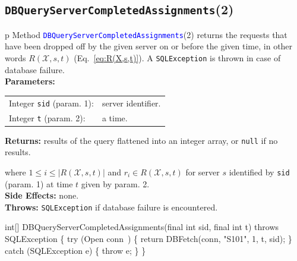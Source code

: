 \subsection{\texttt{DBQueryServerCompletedAssignments}(2)}
\begin{tabular}{p{\textwidth}}
\toprule
{}
Method \textcolor{blue}{{\tt{}\protect{}DBQueryServerCompletedAssignments}}(2) returns the
requests that have been dropped off by the given server on or before the given time,
in other words $R(\mathcal{X},s,t)$ (Eq.~\ref{eq:R(X,s,t)}).
A {\tt{}SQLException} is thrown in case of database failure.\\
\midrule
\textbf{Parameters:} \\
\begin{tabular}{lp{116mm}}
Integer {\tt{}sid} (param. 1):&server identifier.\\
Integer {\tt{}t} (param. 2):&a time.\\
\end{tabular}
\textbf{Returns:} results of the query flattened into an integer array,
or {\tt{}null} if no results.


where $1\leq i\leq |R(\mathcal{X},s,t)|$ and
$r_i\in R(\mathcal{X},s,t)$ for server $s$ identified by {\tt{}sid} (param. 1)
at time $t$ given by param. 2.\\
\textbf{Side Effects:} none.\\
\textbf{Throws:} {\tt{}SQLException} if database failure is encountered.\\
\bottomrule
\end{tabular}
\nwenddocs{}\endmoddef{}
int[] DBQueryServerCompletedAssignments(final int sid, final int t)
throws SQLException \{
  try (\LA{}Open \code{}conn\edoc{}~{\nwtagstyle{}}\RA{}) \{
    return DBFetch(conn, "S101", 1, t, sid);
  \} catch (SQLException e) \{
    throw e;
  \}
\}
\eatline
{}\nwendcode{}\nwdocspar
